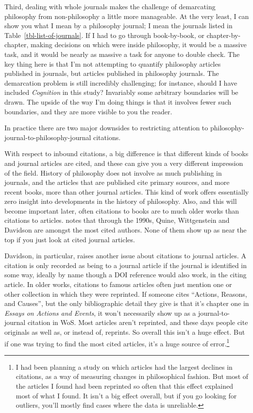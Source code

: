 \documentclass[
]{ergoclass}
\begin{document}
Third, dealing with whole journals makes the challenge of demarcating
philosophy from non-philosophy a little more manageable. At the very
least, I can show you what I mean by a philosophy journal; I mean the
journals listed in Table~\ref{tbl-list-of-journals}. If I had to go
through book-by-book, or chapter-by-chapter, making decisions on which
were inside philosophy, it would be a massive task, and it would be
nearly as massive a task for anyone to double check. The key thing here
is that I'm not attempting to quantify philosophy articles published in
journals, but articles published in philosophy journals. The demarcation
problem is still incredibly challenging; for instance, should I have
included \emph{Cognition} in this study? Invariably some arbitrary
boundaries will be drawn. The upside of the way I'm doing things is that
it involves fewer such boundaries, and they are more visible to you the
reader.

In practice there are two major downsides to restricting attention to
philosophy-journal-to-philosophy-journal citations.

With respect to inbound citations, a big difference is that different
kinds of books and journal articles are cited, and these can give you a
very different impression of the field. History of philosophy does not
involve as much publishing in journals, and the articles that are
published cite primary sources, and more recent books, more than other
journal articles. This kind of work offers essentially zero insight into
developments in the history of philosophy. Also, and this will become
important later, often citations to books are to much older works than
citations to articles. \citet{Petrovich2024} notes that through the
1990s, Quine, Wittgenstein and Davidson are amongst the most cited
authors. None of them show up as near the top if you just look at cited
journal articles.

Davidson, in particular, raises another issue about citations to journal
articles. A citation is only recorded as being to a journal article if
the journal is identified in some way, ideally by name though a DOI
reference would also work, in the citing article. In older works,
citations to famous articles often just mention one or other collection
in which they were reprinted. If someone cites ``Actions, Reasons, and
Causes'', but the only bibliographic detail they give is that it's
chapter one in \emph{Essays on Actions and Events}, it won't necessarily
show up as a journal-to-journal citation in WoS. Most articles aren't
reprinted, and these days people cite originals as well as, or instead
of, reprints. So overall this isn't a huge effect. But if one was trying
to find the most cited articles, it's a huge source of error.\footnote{I
  had been planning a study on which articles had the largest declines
  in citations, as a way of measuring changes in philosophical fashion.
  But most of the articles I found had been reprinted so often that this
  effect explained most of what I found. It isn't a big effect overall,
  but if you go looking for outliers, you'll mostly find cases where the
  data is unreliable.}
\end{document}
